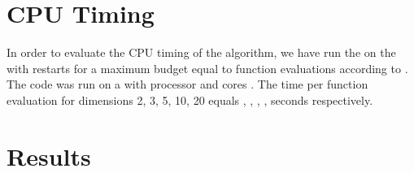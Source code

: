 \documentclass[sigconf]{acmart}
\begin{document}




\maketitle


%
%
%
\section{CPU Timing}
In order to evaluate the CPU timing of the algorithm, we have run the  on the   with restarts for a maximum budget equal to  function evaluations according to \cite{hansen2016exp}. The  code was run on a  with  processor and  cores . The time per function evaluation for dimensions 2, 3, 5, 10, 20 equals , , , ,  seconds respectively. 




\section{Results}
\end{document}

